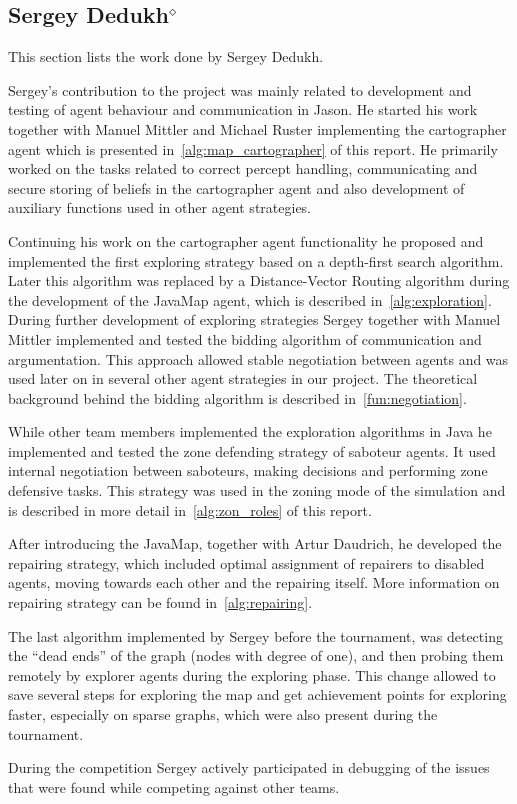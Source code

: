 \subsection[Sergey Dedukh]{Sergey Dedukh$^{\diamond}$}
This section lists the work done by Sergey Dedukh.

Sergey's contribution to the project was mainly related to development and testing of agent behaviour and communication in Jason.
He started his work together with Manuel Mittler and Michael Ruster implementing the cartographer agent which is presented in~\autoref{alg:map_cartographer} of this report.
He primarily worked on the tasks related to correct percept handling, communicating and secure storing of beliefs in the cartographer agent and also development of auxiliary functions used in other agent strategies.

Continuing his work on the cartographer agent functionality he proposed and implemented the first exploring strategy based on a depth-first search algorithm.
Later this algorithm was replaced by a Distance-Vector Routing algorithm during the development of the JavaMap agent, which is described in~\autoref{alg:exploration}.
During further development of exploring strategies Sergey together with Manuel Mittler implemented and tested the bidding algorithm of communication and argumentation.
This approach allowed stable negotiation between agents and was used later on in several other agent strategies in our project.
The theoretical background behind the bidding algorithm is described in~\autoref{fun:negotiation}.

While other team members implemented the exploration algorithms in Java he implemented and tested the zone defending strategy of saboteur agents.
It used internal negotiation between saboteurs, making decisions and performing zone defensive tasks.
This strategy was used in the zoning mode of the simulation and is described in more detail in~\autoref{alg:zon_roles} of this report.

After introducing the JavaMap, together with Artur Daudrich, he developed the repairing strategy, which included optimal assignment of repairers to disabled agents, moving towards each other and the repairing itself.
More information on repairing strategy can be found in~\autoref{alg:repairing}.

The last algorithm implemented by Sergey before the tournament, was detecting the \enquote{dead ends} of the graph (nodes with degree of one), and then probing them remotely by explorer agents during the exploring phase.
This change allowed to save several steps for exploring the map and get achievement points for exploring faster, especially on sparse graphs, which were also present during the tournament.

During the competition Sergey actively participated in debugging of the issues that were found while competing against other teams.
